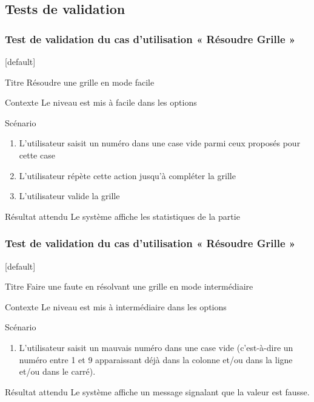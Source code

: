 \documentclass{beamer}
\begin{document}
\subsection{Tests de validation}
\begin{frame}
  \frametitle{Test de validation  du cas d'utilisation « Résoudre Grille »}
  [default]
  \begin{block}{\footnotesize{Titre}}
    \scriptsize{Résoudre une grille en mode facile}
  \end{block}
  \pause
  \begin{block}{\footnotesize{Contexte}}
    \scriptsize{Le niveau est mis à facile dans les options}
  \end{block}
  \pause
  \begin{block}{\footnotesize{Scénario}}
    \begin{enumerate}
      [circle]
      \item
        \scriptsize{L'utilisateur saisit un numéro dans une case vide parmi ceux proposés pour cette case}
      \item
        \scriptsize{L’utilisateur répète cette action jusqu’à compléter la grille}
      \item
        \scriptsize{L’utilisateur valide la grille}
    \end{enumerate}
  \end{block}
  \pause
  \begin{block}{\footnotesize{Résultat attendu}}
    \scriptsize{Le système affiche les statistiques de la partie}
  \end{block}
\end{frame}
\begin{frame}
  \frametitle{Test de validation  du cas d'utilisation « Résoudre Grille »}
  [default]
  \begin{block}{\footnotesize{Titre}}
    \scriptsize{Faire une faute en résolvant une grille en mode intermédiaire}
  \end{block}
  \pause
  \begin{block}{\footnotesize{Contexte}}
    \scriptsize{Le niveau est mis à intermédiaire dans les options}
  \end{block}
  \pause
  \begin{block}{\footnotesize{Scénario}}
    \begin{enumerate}
      [circle]
    \item
      \scriptsize{L’utilisateur saisit un mauvais numéro dans une case vide (c’est-à-dire un numéro entre 1 et 9 apparaissant déjà dans la colonne et/ou dans la ligne et/ou dans le carré).}
      \end{enumerate}
    \end{block}
    \pause
    \begin{block}{\footnotesize{Résultat attendu}}
      \scriptsize{Le système affiche un message signalant que la valeur est fausse.}
    \end{block}
  \end{frame}
  
\end{document}
